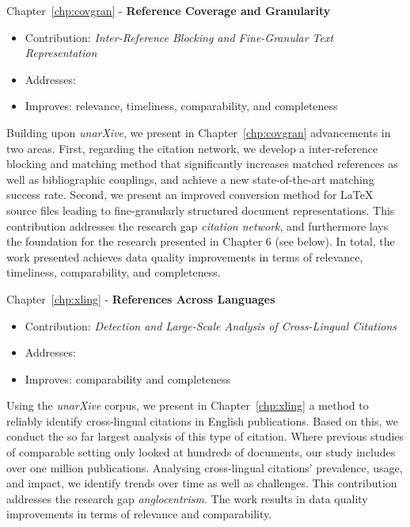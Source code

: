 Chapter~\ref{chp:covgran} - \textbf{Reference Coverage and Granularity}
\begin{itemize}
    \setlength\itemsep{-0.5em}
    \item Contribution: \textit{Inter-Reference Blocking and Fine-Granular Text Representation}
    \item Addresses: 
    \item Improves: relevance, timeliness, comparability, and completeness
\end{itemize}
Building upon \emph{unarXive}, we present in Chapter~\ref{chp:covgran} advancements in two areas. First, regarding the citation network, we develop a inter-reference blocking and matching method that significantly increases matched references as well as bibliographic couplings, and achieve a new state-of-the-art matching success rate. Second, we present an improved conversion method for \LaTeX{} source files leading to fine-granularly structured document representations. %
This contribution addresses the research gap \emph{citation network}, and furthermore lays the foundation for the research presented in Chapter 6 (see below).
In total, the work presented achieves data quality improvements in terms of relevance, timeliness, comparability, and completeness.

Chapter~\ref{chp:xling} - \textbf{References Across Languages}
\begin{itemize}
    \setlength\itemsep{-0.5em}
    \item Contribution: \textit{Detection and Large-Scale Analysis of Cross-Lingual Citations}
    \item Addresses: 
    \item Improves: comparability and completeness
\end{itemize}
Using the \emph{unarXive} corpus, we present in Chapter~\ref{chp:xling} a method to reliably identify cross-lingual citations in English publications. Based on this, we conduct the so far largest analysis of this type of citation. Where previous studies of comparable setting only looked at hundreds of documents, our study includes over one million publications. Analysing cross-lingual citations' prevalence, usage, and impact, we identify trends over time as well as challenges.
This contribution addresses the research gap \emph{anglocentrism}.
The work results in data quality improvements in %
terms of 
relevance and comparability.

